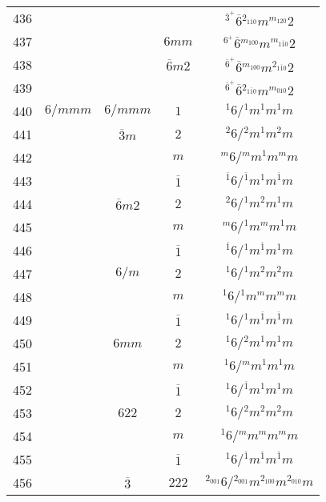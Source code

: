 \begin{longtable}{ccccc}
  436 &  &  &  & ${}^{\overline{3}^{+}} \overline{6} {}^{2_{1\overline{1}0}} m {}^{m_{120}} 2 $\\
  437 &  &  & $6mm$ & ${}^{6^{+}} \overline{6} {}^{m_{100}} m {}^{m_{1\overline{1}0}} 2 $\\
  438 &  &  & $\overline{6}m2$ & ${}^{\overline{6}^{+}} \overline{6} {}^{m_{100}} m {}^{2_{1\overline{1}0}} 2 $\\
  439 &  &  &  & ${}^{\overline{6}^{+}} \overline{6} {}^{2_{1\overline{1}0}} m {}^{m_{010}} 2 $\\
  440 & $6/mmm$ & $6/mmm$ & $1$ & ${}^{1} 6  / {}^{1} m {}^{1} m {}^{1} m $\\
  441 &  & $\overline{3}m$ & $2$ & ${}^{2} 6  / {}^{2} m {}^{1} m {}^{2} m $\\
  442 &  &  & $m$ & ${}^{m} 6  / {}^{m} m {}^{1} m {}^{m} m $\\
  443 &  &  & $\overline{1}$ & ${}^{\overline{1}} 6  / {}^{\overline{1}} m {}^{1} m {}^{\overline{1}} m $\\
  444 &  & $\overline{6}m2$ & $2$ & ${}^{2} 6  / {}^{1} m {}^{2} m {}^{1} m $\\
  445 &  &  & $m$ & ${}^{m} 6  / {}^{1} m {}^{m} m {}^{1} m $\\
  446 &  &  & $\overline{1}$ & ${}^{\overline{1}} 6  / {}^{1} m {}^{\overline{1}} m {}^{1} m $\\
  447 &  & $6/m$ & $2$ & ${}^{1} 6  / {}^{1} m {}^{2} m {}^{2} m $\\
  448 &  &  & $m$ & ${}^{1} 6  / {}^{1} m {}^{m} m {}^{m} m $\\
  449 &  &  & $\overline{1}$ & ${}^{1} 6  / {}^{1} m {}^{\overline{1}} m {}^{\overline{1}} m $\\
  450 &  & $6mm$ & $2$ & ${}^{1} 6  / {}^{2} m {}^{1} m {}^{1} m $\\
  451 &  &  & $m$ & ${}^{1} 6  / {}^{m} m {}^{1} m {}^{1} m $\\
  452 &  &  & $\overline{1}$ & ${}^{1} 6  / {}^{\overline{1}} m {}^{1} m {}^{1} m $\\
  453 &  & $622$ & $2$ & ${}^{1} 6  / {}^{2} m {}^{2} m {}^{2} m $\\
  454 &  &  & $m$ & ${}^{1} 6  / {}^{m} m {}^{m} m {}^{m} m $\\
  455 &  &  & $\overline{1}$ & ${}^{1} 6  / {}^{\overline{1}} m {}^{\overline{1}} m {}^{\overline{1}} m $\\
  456 &  & $\overline{3}$ & $222$ & ${}^{2_{001}} 6  / {}^{2_{001}} m {}^{2_{100}} m {}^{2_{010}} m $\\

\end{longtable}
